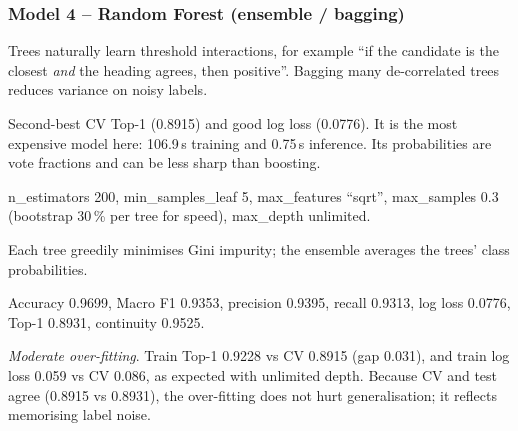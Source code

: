 \documentclass[10pt,a4paper]{article}
\newenvironment{qa}{\begin{description}[leftmargin=0pt,labelsep=0.4em,itemsep=2pt,font=\bfseries\color{accent!80!black}]}{\end{description}}
\begin{document}
\subsubsection*{Model 4 -- Random Forest (ensemble / bagging)}
\begin{qa}
\item[A1. Why suitable?] Trees naturally learn threshold interactions, for example ``if the candidate is the closest \emph{and} the heading agrees, then positive''. Bagging many de-correlated trees reduces variance on noisy labels.
\item[A2. Strengths / limitations.] Second-best CV Top-1 (0.8915) and good log loss (0.0776). It is the most expensive model here: 106.9\,s training and 0.75\,s inference. Its probabilities are vote fractions and can be less sharp than boosting.
\item[B5. Hyperparameters.] n\_estimators 200, min\_samples\_leaf 5, max\_features ``sqrt'', max\_samples 0.3 (bootstrap 30\,\% per tree for speed), max\_depth unlimited.
\item[B6. Objective.] Each tree greedily minimises Gini impurity; the ensemble averages the trees' class probabilities.
\item[C7/C8. Student-test.] Accuracy 0.9699, Macro F1 0.9353, precision 0.9395, recall 0.9313, log loss 0.0776, Top-1 0.8931, continuity 0.9525.
\item[C9. Fit.] \emph{Moderate over-fitting}. Train Top-1 0.9228 vs CV 0.8915 (gap 0.031), and train log loss 0.059 vs CV 0.086, as expected with unlimited depth. Because CV and test agree (0.8915 vs 0.8931), the over-fitting does not hurt generalisation; it reflects memorising label noise.
\end{qa}
\end{document}
